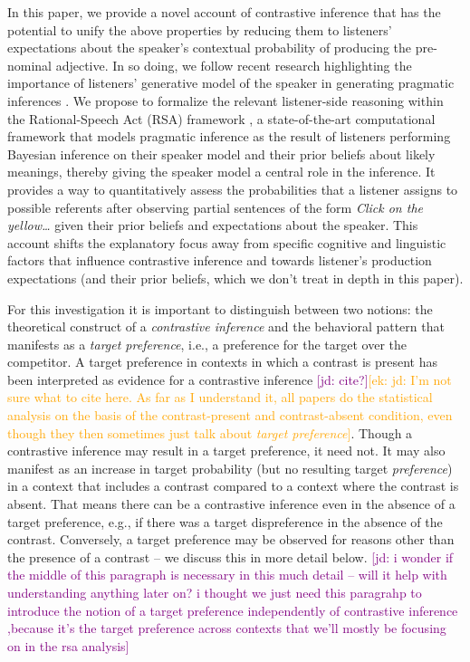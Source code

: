 \documentclass[10pt,letterpaper]{article}
\newcommand{\ek}[1]{\textcolor{Orange}{[ek: #1]}}
\newcommand{\jd}[1]{\textcolor{Purple}{[jd: #1]}}
\begin{document}
In this paper, we provide a novel account of contrastive inference that has the potential to unify the above properties by reducing them to listeners' expectations about the speaker's contextual probability of producing the pre-nominal adjective. In so doing, we follow recent research highlighting the importance of listeners' generative model of the speaker in generating pragmatic inferences \cite{Hawkins:2018,Kao:2015,Kleinschmidt:2011,Kuperberg:2016,Macdonald:1994,Mitchell:1995,Rubio-Fernandez:2018,Seidenberg:1999}. We propose to formalize the relevant listener-side reasoning within the Rational-Speech Act (RSA) framework \cite{Frank:2012, Goodman:2016}, a state-of-the-art computational framework that models pragmatic inference as the result of listeners performing Bayesian inference on their speaker model and their prior beliefs about likely meanings, thereby giving the speaker model a central role in the inference. It provides a way to quantitatively assess the probabilities that a listener assigns to possible referents after observing partial sentences of the form \emph{Click on the yellow\dots} given their prior beliefs and expectations about the speaker. This account shifts the explanatory focus away from specific cognitive and linguistic factors that influence contrastive inference and towards listener's production expectations (and their prior beliefs, which we don't treat in depth in this paper).

For this investigation it is important to distinguish between two notions: the theoretical construct of a \emph{contrastive inference} and the behavioral pattern that manifests as a \emph{target preference}, i.e., a preference for the target over the competitor. A target preference in contexts in which a contrast is present has been interpreted as evidence for a contrastive inference \jd{cite?}\ek{jd: I'm not sure what to cite here. As far as I understand it, all papers do the statistical analysis on the basis of the contrast-present and contrast-absent condition, even though they then sometimes just talk about \textit{target preference}}. Though a contrastive inference may result in a target preference, it need not. It may also manifest as an increase in target probability (but no resulting target \emph{preference}) in a context that includes a contrast compared to a context where the contrast is absent. That means there can be a contrastive inference even in the absence of a target preference, e.g., if there was a target dispreference in the absence of the contrast. Conversely, a target preference may be observed for reasons other than the presence of a contrast -- we discuss this in more detail below. \jd{i wonder if the middle of this paragraph is necessary in this much detail -- will it help with understanding anything later on? i thought we just need this paragrahp to introduce the notion of a target preference independently of contrastive inference ,because it's the target preference across contexts that we'll mostly be focusing on in the rsa analysis}
\end{document}
